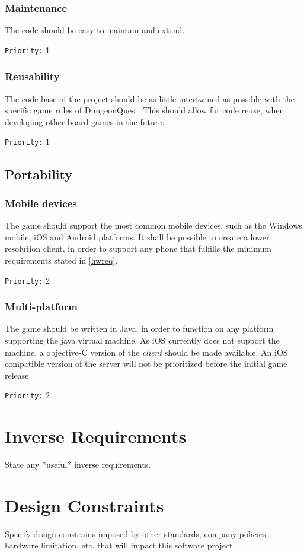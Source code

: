 \documentclass[a4paper,10pt]{article}
\newcommand{\prio}[1]{\texttt{Priority:} #1}
\begin{document}
\subsubsection{Maintenance}
The code should be easy to maintain and extend.

\prio{1}

\subsubsection{Reusability}
The code base of the project should be as little intertwined as possible with the specific game rules of DungeonQuest. This should allow for code reuse, when developing other board games in the future.

\prio{1}

\subsection{Portability}
\subsubsection{Mobile devices}
The game should support the most common mobile devices, such as the Windows mobile, iOS and Android platforms. It shall be possible to create a lower resolution client, in order to support any phone that fulfills the minimum requirements stated in \ref{hwreq}.

\prio{2}

\subsubsection{Multi-platform}
The game should be written in Java, in order to function on any platform supporting the java virtual machine. As iOS currently does not support the machine, a objective-C version of the \emph{client} should be made available. An iOS compatible version of the server will not be prioritized before the initial game release.

\prio{2}

\section{Inverse Requirements}
State any *useful* inverse requirements.

\section{Design Constraints}
Specify design constrains imposed by other standards, company policies, hardware limitation, etc. that will impact this software project.
\end{document}

